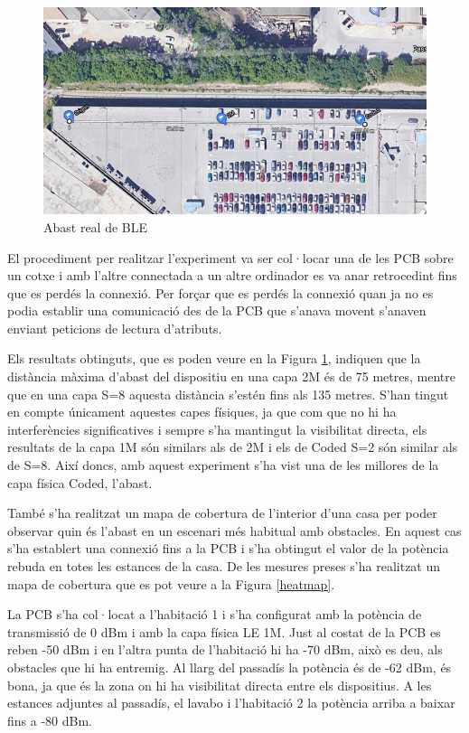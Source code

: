 \begin{figure}[!h]
	\begin{center}
		\includegraphics[width=\textwidth]{./images/prova_abast.png}
		\caption{Abast real de BLE}
		\label{abast}
	\end{center}
\end{figure}

El procediment per realitzar l'experiment va ser col·locar una de les PCB sobre un cotxe i amb l'altre connectada a un altre ordinador es va anar retrocedint fins que es perdés la connexió.
Per forçar que es perdés la connexió quan ja no es podia establir una comunicació des de la PCB que s'anava movent s'anaven enviant peticions de lectura d'atributs.

Els resultats obtinguts, que es poden veure en la Figura \ref{abast}, indiquen que la distància màxima d'abast del dispositiu en una capa 2M és de 75 metres, mentre que en una capa S=8 aquesta distància s'estén fins als 135 metres.
S'han tingut en compte únicament aquestes capes físiques, ja que com que no hi ha interferències significatives i sempre s'ha mantingut la visibilitat directa, els resultats de la capa 1M són similars als de 2M i els de Coded S=2 són similar als de S=8.
Així doncs, amb aquest experiment s'ha vist una de les millores de la capa física Coded, l'abast.
\newpage

També s'ha realitzat un mapa de cobertura de l'interior d'una casa per poder observar quin és l'abast en un escenari més habitual amb obstacles.
En aquest cas s'ha establert una connexió fins a la PCB i s'ha obtingut el valor de la potència rebuda en totes les estances de la casa. De les mesures preses s'ha realitzat un mapa de cobertura que es pot veure a la Figura \ref{heatmap}.

La PCB s'ha col·locat a l'habitació 1 i s'ha configurat amb la potència de transmissió de 0 dBm i amb la capa física LE 1M.
Just al costat de la PCB es reben -50 dBm i en l'altra punta de l'habitació hi ha -70 dBm, això es deu, als obstacles que hi ha entremig.
Al llarg del passadís la potència és de -62 dBm, és bona, ja que és la zona on hi ha visibilitat directa entre els dispositius.
A les estances adjuntes al passadís, el lavabo i l'habitació 2 la potència arriba a baixar fins a -80 dBm.

